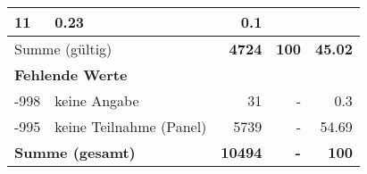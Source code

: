 \begin{longtable}{lXrrr}
       \num{11} &
       \num[round-mode=places,round-precision=2]{0.23} &
         \num[round-mode=places,round-precision=2]{0.1} \\
     \midrule
     \multicolumn{2}{l}{Summe (gültig)} &
       \textbf{\num{4724}} &
     \textbf{\num{100}} &
       \textbf{\num[round-mode=places,round-precision=2]{45.02}} \\
     \multicolumn{5}{l}{\textbf{Fehlende Werte}}\\
       -998 &
       keine Angabe &
         \num{31} &
        - &
         \num[round-mode=places,round-precision=2]{0.3} \\
       -995 &
       keine Teilnahme (Panel) &
         \num{5739} &
        - &
         \num[round-mode=places,round-precision=2]{54.69} \\
     \midrule
     \multicolumn{2}{l}{\textbf{Summe (gesamt)}} &
          \textbf{\num{10494}} &
        \textbf{-} &
        \textbf{\num{100}} \\
     \bottomrule
     \end{longtable}
     
